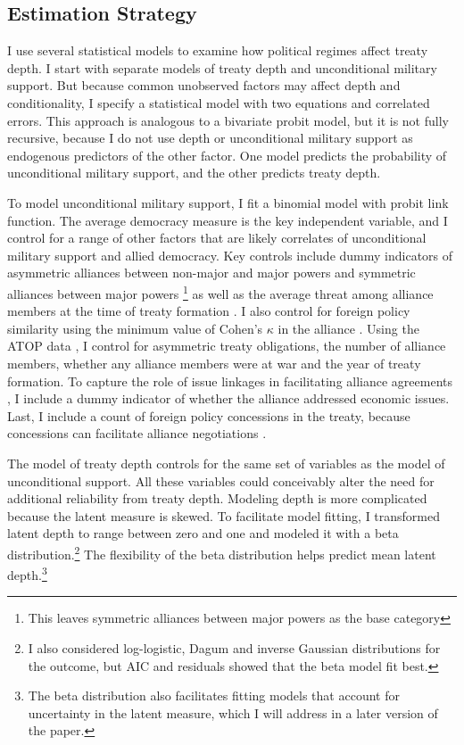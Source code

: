 \documentclass[12pt]{article}
\begin{document}
\subsection{Estimation Strategy}

I use several statistical models to examine how political regimes affect treaty depth. 
I start with separate models of treaty depth and unconditional military support. 
But because common unobserved factors may affect depth and conditionality, I specify a statistical model with two equations and correlated errors.
This approach is analogous to a bivariate probit model, but it is not fully recursive, because I do not use depth or unconditional military support as endogenous predictors of the other factor. 
One model predicts the probability of unconditional military support, and the other predicts treaty depth.


To model unconditional military support, I fit a binomial model with probit link function. 
The average democracy measure is the key independent variable, and I control for a range of other factors that are likely correlates of unconditional military support and allied democracy. 
Key controls include dummy indicators of asymmetric alliances between non-major and major powers and symmetric alliances between major powers \citep{Mattes2012}\footnote{This leaves symmetric alliances between major powers as the base category} as well as the average threat among alliance members at the time of treaty formation \citep{LeedsSavun2007}. 
I also control for foreign policy similarity \citep{Benson2012} using the minimum value of Cohen's $\kappa$ in the alliance \citep{Hage2011}.
Using the ATOP data \citep{Leedsetal2002}, I control for asymmetric treaty obligations, the number of alliance members, whether any alliance members were at war and the year of treaty formation. 
To capture the role of issue linkages in facilitating alliance agreements \citep{Poast2012, Poast2013}, I include a dummy indicator of whether the alliance addressed economic issues.  
Last, I include a count of foreign policy concessions in the treaty, because concessions can facilitate alliance negotiations \citep{Johnson2015}. 


The model of treaty depth controls for the same set of variables as the model of unconditional support. 
All these variables could conceivably alter the need for additional reliability from treaty depth. 
Modeling depth is more complicated because the latent measure is skewed.
To facilitate model fitting, I transformed latent depth to range between zero and one and modeled it with a beta distribution.\footnote{I also considered log-logistic, Dagum and inverse Gaussian distributions for the outcome, but AIC and residuals showed that the beta model fit best.}
The flexibility of the beta distribution helps predict mean latent depth.\footnote{The beta distribution also facilitates fitting models that account for uncertainty in the latent measure, which I will address in a later version of the paper.} 
\end{document}
